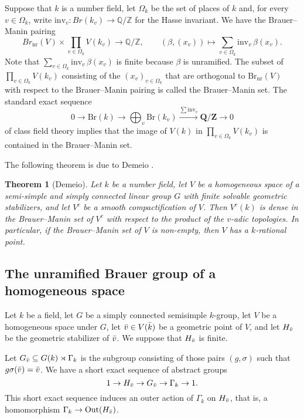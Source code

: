 \documentclass[10pt,letterpaper,twoside]{article}
\renewcommand{\1}{\mathbf{1}}
\newcommand{\bQ}{\mathbf{Q}}
\newcommand{\bZ}{\mathbf{Z}}
\newcommand{\inv}{\mathrm{inv}}
\newcommand{\nr}{\mathrm{nr}}
\newcommand{\Br}{\mathrm{Br}}
\theoremstyle{plain}
\newtheorem{theorem}{Theorem}[section]
\theoremstyle{plain}
\theoremstyle{definition}
\theoremstyle{named}
\theoremstyle{definition}
\begin{document}
	Suppose that $k$ is a number field, let $\Omega_k$ be the set of places of $k$ and, for every $v \in \Omega_k$, write $\text{inv}_v: Br(k_v) \to \mathbb{Q}/\mathbb{Z}$ for the Hasse invariant. We have the Brauer--Manin pairing
	\[
	Br_\nr(V) \times \prod_{v \in \Omega_k} V(k_v) \to \mathbb{Q}/\mathbb{Z}, \qquad (\beta, (x_v)) \mapsto \sum_{v \in \Omega_k} \text{inv}_v \, \beta(x_v).
	\]
	Note that $\sum_{v \in \Omega_k} \text{inv}_v \, \beta(x_v)$ is finite because $\beta$ is
	unramified. The subset of $\prod_{v \in \Omega_k} V(k_v)$ consisting of the $(x_v)_{v\in \Omega_k}$
	that are orthogonal to $\Br_\nr(V)$ with respect to the Brauer--Manin pairing is called the
	Brauer--Manin set. The standard exact sequence
	$$0\rightarrow\Br(k)\rightarrow\bigoplus_v\Br(k_v)\xrightarrow{\sum\inv_v}\bQ/\bZ\rightarrow 0$$ of class field theory implies that the image of $V(k)$ in $\prod_{v \in \Omega_k} V(k_v)$ is contained in the Brauer--Manin set.
	
	The following theorem is due to Demeio \cite{}.
	
	\begin{theorem}[Demeio]
		Let $k$ be a number field, let $V$ be a homogeneous space of a semi-simple and simply connected
		linear group $G$ with finite solvable geometric stabilizers, and let $V^c$ be a smooth
		compactification of $V$. Then $V^c(k)$ is dense in the Brauer–Manin set of $V^c$ with respect to
		the product of the $v$-adic topologies. In particular, if the Brauer--Manin set of $V$ is
		non-empty, then $V$ has a $k$-rational point.
	\end{theorem}
	
	\subsection{The unramified Brauer group of a homogeneous space}
	Let $k$ be a field, let $G$ be a simply connected semisimple $k$-group, let $V$ be a homogeneous space under $G$, let $\Bar{v}\in V(\Bar{k})$ be a geometric point of $V$, and let $H_{\Bar{v}}$ be the geometric stabilizer of $\Bar{v}$. We suppose that $H_{\Bar{v}}$ is finite.
	
	Let $G_{\Bar{v}} \subseteq G(k) \rtimes \Gamma_k$ is the subgroup consisting of those pairs $(g, \sigma)$ such that $g\sigma(\Bar{v}) = \Bar{v}$. We have a short exact sequence of abstract groups
	\[
	1 \to H_{\Bar{v}} \to G_{\Bar{v}} \to \Gamma_k \to 1.
	\]
	This short exact sequence induces an outer action of $\Gamma_k$ on $H_{\Bar{v}}$, that is, a homomorphism $\Gamma_k\to \mathrm{Out}(H_{\Bar{v}})$. 
	
\end{document}
